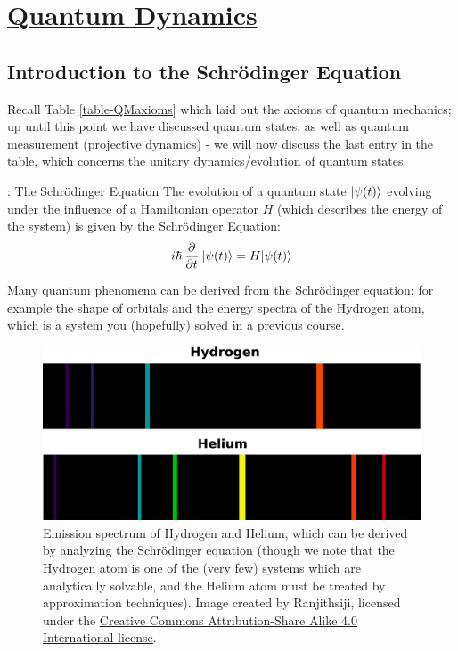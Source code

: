 \section[Quantum Dynamics]{\hyperlink{toc}{Quantum Dynamics}}

\subsection{Introduction to the Schr\"{o}dinger Equation}
Recall Table \ref{table-QMaxioms} which laid out the axioms of quantum mechanics; up until this point we have discussed quantum states, as well as quantum measurement (projective dynamics) - we will now discuss the last entry in the table, which concerns the unitary dynamics/evolution of quantum states.

\begin{axiombox}{: The Schr\"{o}dinger Equation}\label{axiom-SE}
    The evolution of a quantum state $\lvert \psi(t) \rangle$ evolving under the influence of a Hamiltonian operator $H$ (which describes the energy of the system) is given by the Schr\"{o}dinger Equation:
    \begin{equation}\label{eq-SEbasisindep}
        i\hbar\dpd{}{t}\ket{\psi(t)} = H\ket{\psi(t)}
    \end{equation}
\end{axiombox}

Many quantum phenomena can be derived from the Schr\"{o}dinger equation; for example the shape of orbitals and the energy spectra of the Hydrogen atom, which is a system you (hopefully) solved in a previous course.

\begin{figure}[htbp]
    \centering
    \includegraphics[scale=0.1]{Images/HHespectrum.png}
    \caption{Emission spectrum of Hydrogen and Helium, which can be derived by analyzing the Schr\"{o}dinger equation (though we note that the Hydrogen atom is one of the (very few) systems which are analytically solvable, and the Helium atom must be treated by approximation techniques). Image created by Ranjithsiji, licensed under the \href{https://creativecommons.org/licenses/by-sa/4.0/deed.en}{Creative Commons Attribution-Share Alike 4.0 International license}. }
    \label{fig-HHespectrum}
\end{figure}

